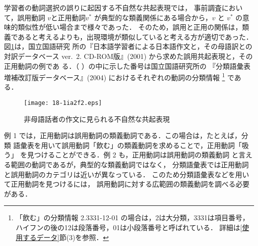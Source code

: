 \documentclass[japanese]{jnlp_1.4}
\begin{document}
学習者の動詞選択の誤りに起因する不自然な共起表現では，
事前調査において，誤用動詞 $v$と正用動詞$v^*$ 
が典型的な類義関係にある場合から，$v$ と $v^*$ の意味的類似性が低い場合まで様々であった．
そのため，誤用と正用の関係は，類義であると考えるよりも，出現環境が類似していると考える方が適切であった．
図\ref{図:誤用正用の例}は，国立国語研究
所の『日本語学習者による日本語作文と，その母語訳との対訳データベース 
ver.~2. CD-ROM版』(2001) から求めた誤用共起表現と，その正用動詞の例であ
る．（ ）の中に示した番号は国立国語研究所の
『分類語彙表増補改訂版データベース』(2004)
におけるそれぞれの動詞の分類情報
\footnote{
「飲む」の分類情報 2.3331-12-01 の場合は，2は大分類，3331は項目番号，ハイフンの後の12は段落番号，01は小段落番号と呼ばれている．
詳細は\ref{使用するデータ}節(3)を参照．
}
である．

\begin{figure}[b]
\begin{center}
\texttt{[image: 18-1ia2f2.eps]}
\caption{非母語話者の作文に見られる不自然な共起表現}
\label{図:誤用正用の例}
\end{center}
\end{figure}

例 1 では，正用動詞は誤用動詞の類義動詞である．この場合は，たとえば，分類
語彙表を用いて誤用動詞「飲む」の類義動詞を求めることで，正用動詞「吸う」
を見つけることができる．例 2 も，正用動詞は誤用動詞の類義動詞
と言える範囲の動詞であるが，典型的な類義動詞ではなく，
分類語彙表では正用動詞と誤用動詞のカテゴリは近いが異なっている．
このため分類語彙表などを用いて正用動詞を見つけるには，
誤用動詞に対する広範囲の類義動詞を調べる必要がある．
\end{document}
